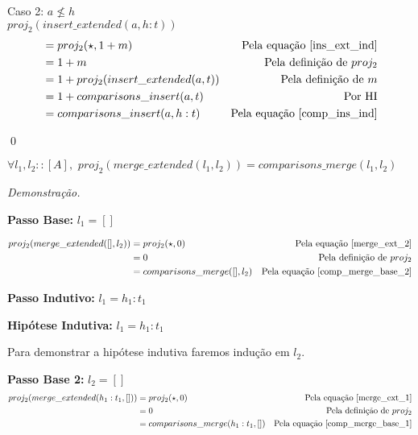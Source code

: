\documentclass[12pt, oneside, a4paper,english,brazil]{abntex2}
\begin{document}
Caso 2: $a \not\le h$ \\

$proj_{2}(insert\_extended(a, h : t))$
\begin{align*}
  &= proj_{2}(\star, 1 + m) &\text{Pela equa\c{c}\~ao \ref{ins_ext_ind}} \\
                                    &= 1 + m &\text{Pela defini\c{c}\~ao de } proj_{2} \\
                                    &= 1 + proj_{2}(insert\_extended(a, t)) &\text{Pela defini\c{c}\~ao de } m\\
                                    &= 1 + comparisons\_insert(a, t) &\text{Por HI} \\
  &= comparisons\_insert(a, h : t) &\text{Pela equa\c{c}\~ao \ref{comp_ins_ind}}
\end{align*}

\qed

\begin{teorema}
  $\forall l_{1}, l_{2} :: [A], \,\, proj_{2}(merge\_extended(l_{1}, l_{2})) = comparisons\_merge(l_{1}, l_{2})$
\end{teorema}

\noindent \textit{Demonstra\c{c}\~ao.}

\textbf{Passo Base: } $l_{1} = []$

\begin{align*}
  proj_{2}(merge\_extended([], l_{2})) &= proj_{2}(\star, 0) &\text{Pela equa\c{c}\~ao \ref{merge_ext_2}} \\
                                       &= 0 &\text{Pela defini\c{c}\~ao de $proj_{2}$} \\
  &= comparisons\_merge([], l_{2}) &\text{Pela equa\c{c}\~ao \ref{comp_merge_base_2}} \\
\end{align*}

\textbf{Passo Indutivo: } $l_{1} = h_{1} : t_{1}$

\textbf{Hip\'otese Indutiva: } $l_{1} = h_{1} : t_{1}$

Para demonstrar a hip\'otese indutiva faremos indu\c{c}\~ao em $l_{2}$.

\textbf{Passo Base 2: } $l_{2} = []$
\begin{align*}
  proj_{2}(merge\_extended(h_{1} : t_{1}, [])) &= proj_{2}(\star, 0) &\text{Pela equa\c{c}\~ao \ref{merge_ext_1}} \\
                                               &= 0 &\text{Pela defini\c{c}\~ao de $proj_{2}$} \\
  &= comparisons\_merge(h_{1} : t_{1}, []) &\text{Pela equa\c{c}\~ao \ref{comp_merge_base_1}}
\end{align*}
\end{document}
